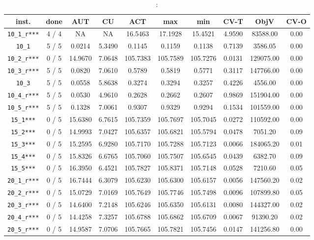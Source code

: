 \begin{table}[h!]
\begin{center}
\small
\begin{tabular}{| c | c | c | c | c | c | c | c | c | c |}
\hline
inst. & done & AUT & CU & ACT & max & min & CV-T & ObjV & CV-O \\
\hline
\verb|10_1_r***| & 4 / 4 & NA & NA & 16.5463 & 17.1928 & 15.4521 & 4.9590 & 83588.00 & 0.00\\ 
\verb|10_1| & 5 / 5 & 0.0214 & 5.3490 & 0.1145 & 0.1159 & 0.1138 & 0.7139 & 3586.05 & 0.00\\ 
\verb|10_2_r***| & 0 / 5 & 14.9670 & 7.0648 & 105.7383 & 105.7589 & 105.7276 & 0.0131 & 129075.00 & 0.00\\ 
\verb|10_3_r***| & 5 / 5 & 0.0820 & 7.0610 & 0.5789 & 0.5819 & 0.5771 & 0.3117 & 147766.00 & 0.00\\ 
\verb|10_3| & 5 / 5 & 0.0558 & 5.8638 & 0.3274 & 0.3294 & 0.3257 & 0.4226 & 4556.00 & 0.00\\ 
\verb|10_4_r***| & 5 / 5 & 0.0530 & 4.9610 & 0.2628 & 0.2662 & 0.2607 & 0.9869 & 151904.00 & 0.00\\ 
\verb|10_5_r***| & 5 / 5 & 0.1328 & 7.0061 & 0.9307 & 0.9329 & 0.9294 & 0.1534 & 101559.00 & 0.00\\ 
\verb|15_1***| & 0 / 5 & 15.6380 & 6.7615 & 105.7359 & 105.7697 & 105.7045 & 0.0272 & 110592.00 & 0.00\\ 
\verb|15_2***| & 0 / 5 & 14.9993 & 7.0427 & 105.6357 & 105.6821 & 105.5794 & 0.0478 & 7051.20 & 0.09\\ 
\verb|15_3***| & 0 / 5 & 15.2595 & 6.9280 & 105.7170 & 105.7288 & 105.7123 & 0.0066 & 184065.20 & 0.01\\ 
\verb|15_4***| & 0 / 5 & 15.8326 & 6.6765 & 105.7060 & 105.7507 & 105.6545 & 0.0439 & 6382.70 & 0.09\\ 
\verb|15_5***| & 0 / 5 & 16.3950 & 6.4521 & 105.7827 & 105.8371 & 105.7148 & 0.0528 & 7210.60 & 0.05\\ 
\verb|20_1_r***| & 0 / 5 & 16.7444 & 6.3079 & 105.6230 & 105.6300 & 105.6157 & 0.0056 & 147560.20 & 0.02\\ 
\verb|20_2_r***| & 0 / 5 & 15.0729 & 7.0169 & 105.7649 & 105.7746 & 105.7498 & 0.0096 & 107899.80 & 0.05\\ 
\verb|20_3_r***| & 0 / 5 & 14.6400 & 7.2148 & 105.6246 & 105.6350 & 105.6131 & 0.0080 & 144327.00 & 0.02\\  
\verb|20_4_r***| & 0 / 5 & 14.4258 & 7.3257 & 105.6788 & 105.6862 & 105.6709 & 0.0067 & 91390.20 & 0.02\\ 
\verb|20_5_r***| & 0 / 5 & 14.9587 & 7.0706 & 105.7665 & 105.7821 & 105.7456 & 0.0147 & 141256.80 & 0.00\\ 
\hline
\end{tabular}
\caption{:}
\label{table:}
\end{center}
\end{table}

